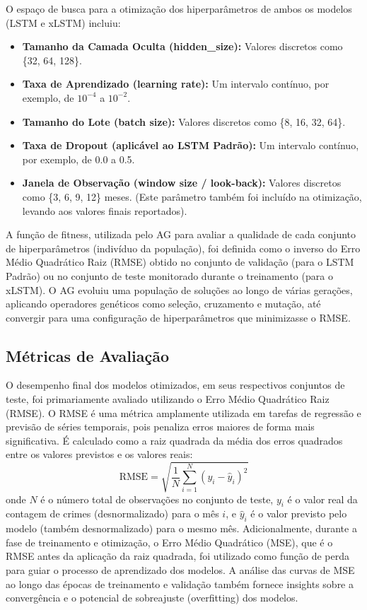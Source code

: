 \documentclass[conference]{IEEEtran}
\begin{document}
O espaço de busca para a otimização dos hiperparâmetros de ambos os modelos (LSTM e xLSTM) incluiu:
\begin{itemize}
    \item \textbf{Tamanho da Camada Oculta (hidden\_size):} Valores discretos como \{32, 64, 128\}.
    \item \textbf{Taxa de Aprendizado (learning rate):} Um intervalo contínuo, por exemplo, de $10^{-4}$ a $10^{-2}$.
    \item \textbf{Tamanho do Lote (batch size):} Valores discretos como \{8, 16, 32, 64\}.
    \item \textbf{Taxa de Dropout (aplicável ao LSTM Padrão):} Um intervalo contínuo, por exemplo, de 0.0 a 0.5.
    \item \textbf{Janela de Observação (window size / look-back):} Valores discretos como \{3, 6, 9, 12\} meses. (Este parâmetro também foi incluído na otimização, levando aos valores finais reportados).
\end{itemize}
A função de fitness, utilizada pelo AG para avaliar a qualidade de cada conjunto de hiperparâmetros (indivíduo da população), foi definida como o inverso do Erro Médio Quadrático Raiz (RMSE) obtido no conjunto de validação (para o LSTM Padrão) ou no conjunto de teste monitorado durante o treinamento (para o xLSTM). O AG evoluiu uma população de soluções ao longo de várias gerações, aplicando operadores genéticos como seleção, cruzamento e mutação, até convergir para uma configuração de hiperparâmetros que minimizasse o RMSE.

\subsection{Métricas de Avaliação}
O desempenho final dos modelos otimizados, em seus respectivos conjuntos de teste, foi primariamente avaliado utilizando o Erro Médio Quadrático Raiz (RMSE). O RMSE é uma métrica amplamente utilizada em tarefas de regressão e previsão de séries temporais, pois penaliza erros maiores de forma mais significativa. É calculado como a raiz quadrada da média dos erros quadrados entre os valores previstos e os valores reais:
$$ \text{RMSE} = \sqrt{\frac{1}{N} \sum_{i=1}^{N} (y_i - \hat{y}_i)^2} $$
onde $N$ é o número total de observações no conjunto de teste, $y_i$ é o valor real da contagem de crimes (desnormalizado) para o mês $i$, e $\hat{y}_i$ é o valor previsto pelo modelo (também desnormalizado) para o mesmo mês.
Adicionalmente, durante a fase de treinamento e otimização, o Erro Médio Quadrático (MSE), que é o RMSE antes da aplicação da raiz quadrada, foi utilizado como função de perda para guiar o processo de aprendizado dos modelos. A análise das curvas de MSE ao longo das épocas de treinamento e validação também fornece insights sobre a convergência e o potencial de sobreajuste (overfitting) dos modelos.
\end{document}

